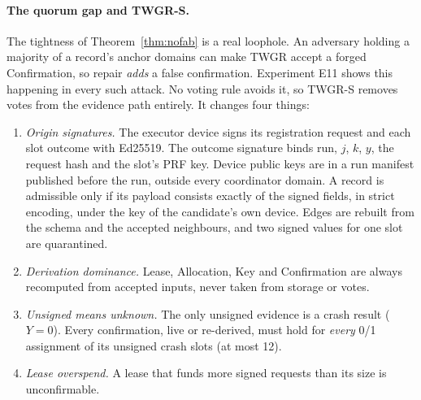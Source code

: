 \documentclass[11pt]{article}
\theoremstyle{definition}
\begin{document}
\paragraph{The quorum gap and TWGR-S.} The tightness of Theorem~\ref{thm:nofab} is a real loophole. An adversary holding a majority of a record's anchor domains can make TWGR accept a forged Confirmation, so repair \emph{adds} a false confirmation. Experiment E11 shows this happening in every such attack. No voting rule avoids it, so TWGR-S removes votes from the evidence path entirely. It changes four things:
\begin{enumerate}
\item \emph{Origin signatures.} The executor device signs its registration request and each slot outcome with Ed25519. The outcome signature binds run, $j$, $k$, $y$, the request hash and the slot's PRF key. Device public keys are in a run manifest published before the run, outside every coordinator domain. A record is admissible only if its payload consists exactly of the signed fields, in strict encoding, under the key of the candidate's own device. Edges are rebuilt from the schema and the accepted neighbours, and two signed values for one slot are quarantined.
\item \emph{Derivation dominance.} Lease, Allocation, Key and Confirmation are always recomputed from accepted inputs, never taken from storage or votes.
\item \emph{Unsigned means unknown.} The only unsigned evidence is a crash result ($Y=0$). Every confirmation, live or re-derived, must hold for \emph{every} 0/1 assignment of its unsigned crash slots (at most 12).
\item \emph{Lease overspend.} A lease that funds more signed requests than its size is unconfirmable.
\end{enumerate}
\end{document}
